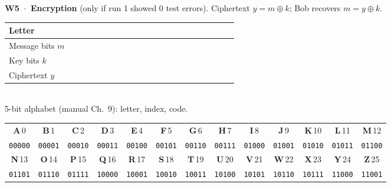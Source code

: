 \documentclass[a4paper,11pt]{article}
\begin{document}
\vspace{5pt}
\textbf{W5 \,$\cdot$\, Encryption} {\small (only if run 1 showed 0 test errors).
Ciphertext $y = m \oplus k$; Bob recovers $m = y \oplus k$.}\\[2pt]
{\small
\begin{tabular}{|L|*{20}{K|}}\hline
Letter &  &  &  &  \\ \hline
Message bits $m$ & & & & & & & & & & & & & & & & & & & & \\ \hline
Key bits $k$ & & & & & & & & & & & & & & & & & & & & \\ \hline
Ciphertext $y$ & & & & & & & & & & & & & & & & & & & & \\ \hline
\end{tabular}}\\[4pt]
{\small 5-bit alphabet (manual Ch.~9): letter, index, code.}\\[2pt]
{\footnotesize\setlength{\tabcolsep}{3.2pt}
\begin{tabular}{|*{13}{c|}}\hline
\textbf{A}\,0 & \textbf{B}\,1 & \textbf{C}\,2 & \textbf{D}\,3 & \textbf{E}\,4 & \textbf{F}\,5 & \textbf{G}\,6 & \textbf{H}\,7 & \textbf{I}\,8 & \textbf{J}\,9 & \textbf{K}\,10 & \textbf{L}\,11 & \textbf{M}\,12 \\
\texttt{00000} & \texttt{00001} & \texttt{00010} & \texttt{00011} & \texttt{00100} & \texttt{00101} & \texttt{00110} & \texttt{00111} & \texttt{01000} & \texttt{01001} & \texttt{01010} & \texttt{01011} & \texttt{01100} \\ \hline
\textbf{N}\,13 & \textbf{O}\,14 & \textbf{P}\,15 & \textbf{Q}\,16 & \textbf{R}\,17 & \textbf{S}\,18 & \textbf{T}\,19 & \textbf{U}\,20 & \textbf{V}\,21 & \textbf{W}\,22 & \textbf{X}\,23 & \textbf{Y}\,24 & \textbf{Z}\,25 \\
\texttt{01101} & \texttt{01110} & \texttt{01111} & \texttt{10000} & \texttt{10001} & \texttt{10010} & \texttt{10011} & \texttt{10100} & \texttt{10101} & \texttt{10110} & \texttt{10111} & \texttt{11000} & \texttt{11001} \\ \hline
\end{tabular}
}
\end{document}
